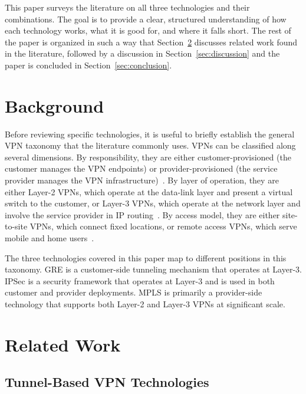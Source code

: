 \documentclass[conference]{IEEEtran}
\begin{document}
This paper surveys the literature on all three technologies and their
combinations. The goal is to provide a clear, structured understanding
of how each technology works, what it is good for, and where it falls
short. The rest of the paper is organized in such a way that
Section~\ref{sec:relatedwork} discusses related work found in the
literature, followed by a discussion in Section~\ref{sec:discussion}
and the paper is concluded in Section~\ref{sec:conclusion}.

\section{Background}

Before reviewing specific technologies, it is useful to briefly
establish the general VPN taxonomy that the literature commonly uses.
VPNs can be classified along several dimensions. By responsibility,
they are either customer-provisioned (the customer manages the VPN
endpoints) or provider-provisioned (the service provider manages the
VPN infrastructure)~\cite{akinsanya2024}. By layer of operation, they
are either Layer-2 VPNs, which operate at the data-link layer and
present a virtual switch to the customer, or Layer-3 VPNs, which
operate at the network layer and involve the service provider in IP
routing~\cite{fayed2024}. By access model, they are either
site-to-site VPNs, which connect fixed locations, or remote access
VPNs, which serve mobile and home users~\cite{rosu2012}.

The three technologies covered in this paper map to different
positions in this taxonomy. GRE is a customer-side tunneling
mechanism that operates at Layer-3. IPSec is a security framework
that operates at Layer-3 and is used in both customer and provider
deployments. MPLS is primarily a provider-side technology that
supports both Layer-2 and Layer-3 VPNs at significant scale.

\section{Related Work}
\label{sec:relatedwork}

\subsection{Tunnel-Based VPN Technologies}
\end{document}
